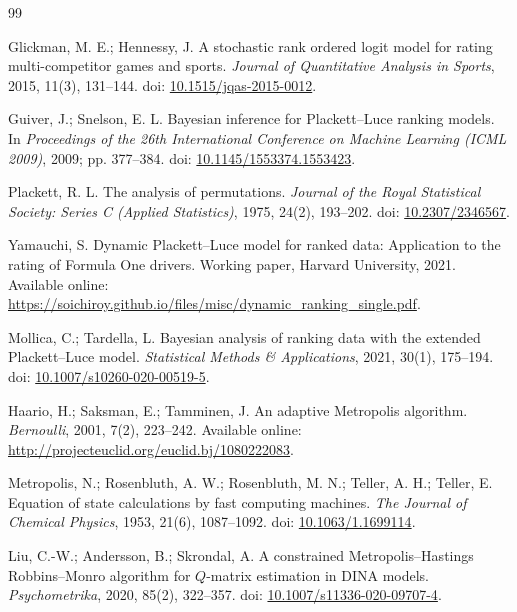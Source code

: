 \documentclass{mcmthesis}
\begin{document}
\begin{thebibliography}{99}
	
	Glickman, M. E.; Hennessy, J.
	\newblock A stochastic rank ordered logit model for rating multi-competitor games and sports.
	\newblock \emph{Journal of Quantitative Analysis in Sports}, 2015, 11(3), 131--144.
	\newblock doi: \href{https://doi.org/10.1515/jqas-2015-0012}{10.1515/jqas-2015-0012}.
	
	Guiver, J.; Snelson, E. L.
	\newblock Bayesian inference for Plackett--Luce ranking models.
	\newblock In \emph{Proceedings of the 26th International Conference on Machine Learning (ICML 2009)}, 2009; pp. 377--384.
	\newblock doi: \href{https://doi.org/10.1145/1553374.1553423}{10.1145/1553374.1553423}.
	
	Plackett, R. L.
	\newblock The analysis of permutations.
	\newblock \emph{Journal of the Royal Statistical Society: Series C (Applied Statistics)}, 1975, 24(2), 193--202.
	\newblock doi: \href{https://doi.org/10.2307/2346567}{10.2307/2346567}.
	
	Yamauchi, S.
	\newblock Dynamic Plackett--Luce model for ranked data: Application to the rating of Formula One drivers.
	\newblock Working paper, Harvard University, 2021.
	\newblock Available online: \url{https://soichiroy.github.io/files/misc/dynamic_ranking_single.pdf}.
	
	Mollica, C.; Tardella, L.
	\newblock Bayesian analysis of ranking data with the extended Plackett--Luce model.
	\newblock \emph{Statistical Methods \& Applications}, 2021, 30(1), 175--194.
	\newblock doi: \href{https://doi.org/10.1007/s10260-020-00519-5}{10.1007/s10260-020-00519-5}.
	
	Haario, H.; Saksman, E.; Tamminen, J.
	\newblock An adaptive Metropolis algorithm.
	\newblock \emph{Bernoulli}, 2001, 7(2), 223--242.
	\newblock Available online: \url{http://projecteuclid.org/euclid.bj/1080222083}.
	
	Metropolis, N.; Rosenbluth, A. W.; Rosenbluth, M. N.; Teller, A. H.; Teller, E.
	\newblock Equation of state calculations by fast computing machines.
	\newblock \emph{The Journal of Chemical Physics}, 1953, 21(6), 1087--1092.
	\newblock doi: \href{https://doi.org/10.1063/1.1699114}{10.1063/1.1699114}.
	
	Liu, C.-W.; Andersson, B.; Skrondal, A.
	\newblock A constrained Metropolis--Hastings Robbins--Monro algorithm for $Q$-matrix estimation in DINA models.
	\newblock \emph{Psychometrika}, 2020, 85(2), 322--357.
	\newblock doi: \href{https://doi.org/10.1007/s11336-020-09707-4}{10.1007/s11336-020-09707-4}.
	

\end{thebibliography}
\end{document}

